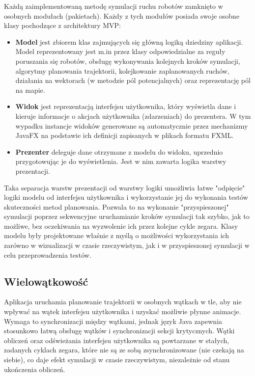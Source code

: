 Każdą zaimplementowaną metodę symulacji ruchu robotów zamknięto w osobnych modułach (pakietach). Każdy z tych modułów posiada swoje osobne klasy pochodzące z architektury MVP:
\begin{itemize}
	\item {\bf Model} jest zbiorem klas zajmujących się główną logiką dziedziny aplikacji. Model reprezentowany jest m.in przez klasy odpowiedzialne za reguły poruszania się robotów, obsługę wykonywania kolejnych kroków symulacji, algorytmy planowania trajektorii, kolejkowanie zaplanowanych ruchów, działania na wektorach (w metodzie pól potencjalnych) oraz reprezentację pól na mapie.
	\item {\bf Widok} jest reprezentacją interfejsu użytkownika, który wyświetla dane i kieruje informacje o akcjach użytkownika (zdarzeniach) do prezentera. W tym wypadku instancje widoków generowane są automatycznie przez mechanizmy JavaFX na podstawie ich definicji zapisanych w plikach formatu FXML.
	\item {\bf Prezenter} deleguje dane otrzymane z modelu do widoku, uprzednio przygotowując je do wyświetlenia. Jest w nim zawarta logika warstwy prezentacji.
\end{itemize}

Taka separacja warstw prezentacji od warstwy logiki umożliwia łatwe "odpięcie" logiki modelu od interfejsu użytkownika i wykorzystanie jej do wykonania testów skuteczności metod planowania. Pozwala to na wykonanie "przyspieszonej" symulacji poprzez sekwencyjne uruchamianie kroków symulacji tak szybko, jak to możliwe, bez oczekiwania na wyzwolenie ich przez kolejne cykle zegara.
Klasy modelu były projektowane właśnie z myślą o możliwości wykorzystania ich zarówno w wizualizacji w czasie rzeczywistym, jak i w przyspieszonej symulacji w celu przeprowadzenia testów.

\subsection{Wielowątkowość}
Aplikacja uruchamia planowanie trajektorii w osobnych wątkach w tle, aby nie wpływać na wątek interfejsu użytkownika i uzyskać możliwie płynne animacje. Wymaga to synchronizacji między wątkami, jednak język Java zapewnia stosunkowo łatwą obsługę wątków i synchronizacji sekcji krytycznych. Wątki obliczeń oraz odświeżania interfejsu użytkownika są powtarzane w stałych, zadanych cyklach zegara, które nie są ze sobą zsynchronizowane (nie czekają na siebie), co daje efekt symulacji w czasie rzeczywistym, niezależnie od stanu ukończenia obliczeń.

